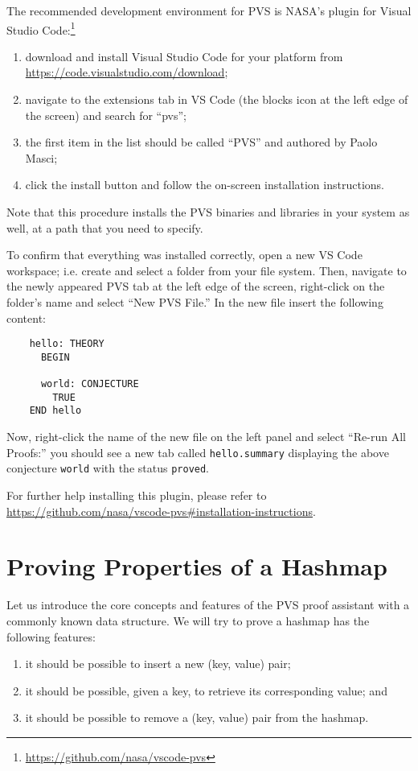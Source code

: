 The recommended development environment for PVS is NASA's plugin for Visual Studio Code:\footnote{%
	\url{https://github.com/nasa/vscode-pvs}
}

\begin{enumerate}
	\item download and install Visual Studio Code for your platform from \url{https://code.visualstudio.com/download};
	\item navigate to the extensions tab in VS Code (the blocks icon at the left edge of the screen) and search for ``pvs'';
	\item the first item in the list should be called ``PVS'' and authored by Paolo Masci;
	\item click the install button and follow the on-screen installation instructions.
\end{enumerate}

Note that this procedure installs the PVS binaries and libraries in your system as well, at a path that you need to specify.

To confirm that everything was installed correctly, open a new VS Code workspace; i.e. create and select a folder from your file system.
Then, navigate to the newly appeared PVS tab at the left edge of the screen, right-click on the folder's name and select ``New PVS File.''
In the new file insert the following content:

\begin{verbatim}
	hello: THEORY
	  BEGIN

	  world: CONJECTURE
	    TRUE
	END hello
\end{verbatim}

Now, right-click the name of the new file on the left panel and select ``Re-run All Proofs:'' you should see a new tab called \texttt{hello.summary} displaying the above conjecture \texttt{world} with the status \texttt{proved}.

For further help installing this plugin, please refer to \url{https://github.com/nasa/vscode-pvs#installation-instructions}.


\section{Proving Properties of a Hashmap}

Let us introduce the core concepts and features of the PVS proof assistant with a commonly known data structure. We will try to prove a hashmap has the following features:

\begin{enumerate}
	\item it should be possible to insert a new (key, value) pair;
	\item it should be possible, given a key, to retrieve its corresponding value; and
	\item it should be possible to remove a (key, value) pair from the hashmap.
\end{enumerate}

